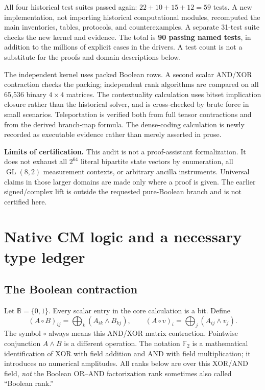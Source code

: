 \documentclass[11pt,a4paper]{article}
\theoremstyle{definition}\newtheorem{definition}[theorem]{Definition}
\newcommand{\F}{\mathbb F_2}
\newcommand{\B}{\mathbb B}
\newcommand{\GL}{\operatorname{GL}}
\begin{document}
All four historical test suites passed again: $22+10+15+12=59$ tests. A new implementation, not importing historical computational modules, recomputed the main inventories, tables, protocols, and counterexamples. A separate 31-test suite checks the new kernel and evidence. The total is \textbf{90 passing named tests}, in addition to the millions of explicit cases in the drivers. A test count is not a substitute for the proofs and domain descriptions below.

The independent kernel uses packed Boolean rows. A second scalar AND/XOR contraction checks the packing; independent rank algorithms are compared on all 65,536 binary $4\times4$ matrices. The contextuality calculation uses bitset implication closure rather than the historical solver, and is cross-checked by brute force in small scenarios. Teleportation is verified both from full tensor contractions and from the derived branch-map formula. The dense-coding calculation is newly recorded as executable evidence rather than merely asserted in prose.

\textbf{Limits of certification.} This audit is not a proof-assistant formalization. It does not exhaust all $2^{64}$ literal bipartite state vectors by enumeration, all $\GL(8,2)$ measurement contexts, or arbitrary ancilla instruments. Universal claims in those larger domains are made only where a proof is given. The earlier signed/complex lift is outside the requested pure-Boolean branch and is not certified here.

\section{Native CM logic and a necessary type ledger}
\subsection{The Boolean contraction}
Let $\B=\{0,1\}$. Every scalar entry in the core calculation is a bit. Define
\begin{equation}
 (A\circ B)_{ij}=\bigoplus_k (A_{ik}\wedge B_{kj}),
 \qquad (A\circ v)_i=\bigoplus_j(A_{ij}\wedge v_j).
 \label{eq:composition}
\end{equation}
The symbol $\circ$ always means this AND/XOR matrix contraction. Pointwise conjunction $A\wedge B$ is a different operation. The notation $\F$ is a mathematical identification of XOR with field addition and AND with field multiplication; it introduces no numerical amplitudes. All ranks below are over this XOR/AND field, \emph{not} the Boolean OR--AND factorization rank sometimes also called ``Boolean rank.''
\end{document}

